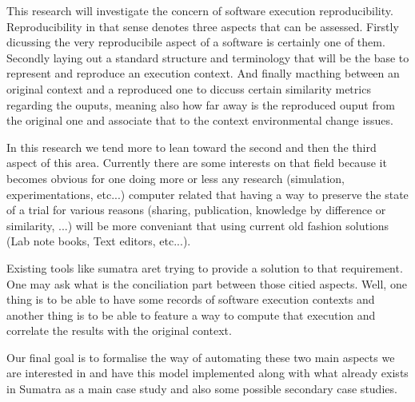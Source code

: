 

This research will investigate the concern of software execution reproducibility.
Reproducibility in that sense denotes three aspects that can be assessed. Firstly dicussing the very
reproducibile aspect of a software is certainly one of them. Secondly laying out a standard structure and
 terminology that will be the base to represent and reproduce an execution context. And finally
 macthing between an original context and a reproduced one to diccuss certain similarity metrics regarding
the ouputs, meaning also how far away is the reproduced ouput from the original one and associate that to
the context environmental change issues.

In this research we tend more to lean toward the second and then the third aspect of this area.
Currently there are some interests on that field because it becomes obvious for one doing more or 
less any research (simulation, experimentations, etc...) computer related that having a way to preserve
the state of a trial for various reasons (sharing, publication, knowledge by difference or similarity, ...)
will be more conveniant that using current old fashion solutions (Lab note books, Text editors, etc...).

Existing tools like sumatra aret trying to provide a solution to that requirement.
One may ask what is the conciliation part between those citied aspects. Well, one thing is to be
able to have some records of software execution contexts and another thing is to be able to feature
a way to compute that execution and correlate the results with the original context.

Our final goal is to formalise the way of automating these two main aspects we are interested in and 
have this model implemented along with what already exists in Sumatra as a main case study and also
some possible secondary case studies.
